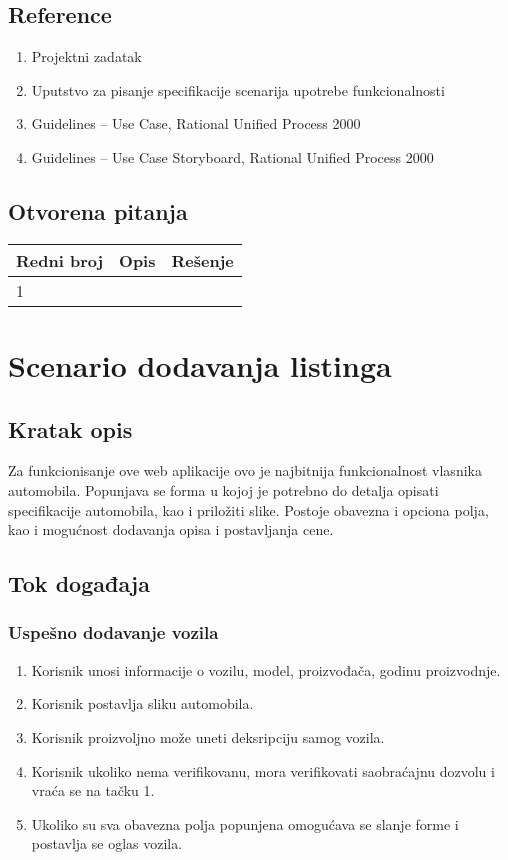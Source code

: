\documentclass[12pt]{article}
\begin{document}
\subsection{Reference}
\begin{enumerate}
   \item Projektni zadatak
   \item Uputstvo za pisanje specifikacije scenarija upotrebe funkcionalnosti
   \item  Guidelines – Use Case, Rational Unified Process 2000
   \item  Guidelines – Use Case Storyboard, Rational Unified Process 2000
 \end{enumerate}
\subsection{Otvorena pitanja}


\begin{center}
\begin{tabular}{ | m{2cm} | m{7cm}| m{7cm} | } 
\hline
Redni broj& Opis & Rešenje \\ 
\hline
1 &  & \\ 
\hline
\end{tabular}
\end{center}

    

\section{Scenario dodavanja listinga}
\subsection{Kratak opis}
Za funkcionisanje ove web aplikacije ovo je najbitnija funkcionalnost vlasnika
automobila. Popunjava se forma u kojoj je potrebno do detalja opisati specifikacije automobila, kao i priložiti slike. 
Postoje obavezna i opciona polja, kao i mogućnost dodavanja opisa i postavljanja cene.
\subsection{Tok događaja}

\subsubsection{Uspešno dodavanje vozila}

\begin{enumerate}
    \item Korisnik unosi informacije o vozilu, model, proizvođača, godinu proizvodnje.
    \item Korisnik postavlja sliku automobila.
    \item Korisnik proizvoljno može uneti deksripciju samog vozila.
    \item Korisnik ukoliko nema verifikovanu, mora verifikovati saobraćajnu dozvolu i vraća se na tačku 1.
    \item Ukoliko su sva obavezna polja popunjena omogućava se slanje forme i postavlja se oglas vozila.
\end{enumerate}
\end{document}
